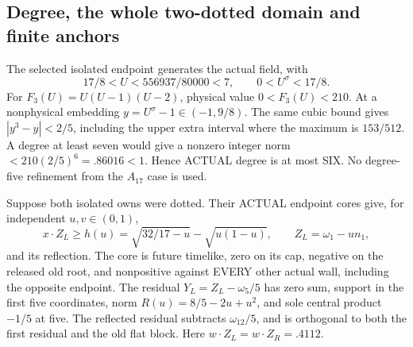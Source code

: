 \documentclass[11pt]{article}
\begin{document}
\subsection{Degree, the whole two-dotted domain and finite anchors}
\label{app:arithA16anchors}

The selected isolated endpoint generates the actual field, with
\[
 17/8<U<556937/80000<7,\qquad0<U^\sigma<17/8 .
\]
For \(F_3(U)=U(U-1)(U-2)\), physical value \(0<F_3(U)<210\).
At a nonphysical embedding \(y=U^\sigma-1\in(-1,9/8)\).
The same cubic bound gives
\(|y^3-y|<2/5\), including the upper extra interval where
the maximum is \(153/512\).
A degree at least seven would give a nonzero integer norm
\(<210(2/5)^6=.86016<1\).
Hence ACTUAL degree is at most SIX.
No degree-five refinement from the \(A_{17}\) case is used.

Suppose both isolated owns were dotted.
Their ACTUAL endpoint cores give, for independent \(u,v\in(0,1)\),
\[
 x\cdot Z_L\ge h(u)=\sqrt{32/17-u}-\sqrt{u(1-u)},\qquad
 Z_L=\omega_1-un_1 ,
\]
and its reflection.
The core is future timelike, zero on its cap, negative on the
released old root, and nonpositive against EVERY other actual
wall, including the opposite endpoint.
The residual \(Y_L=Z_L-\omega_5/5\) has zero sum,
support in the first five coordinates, norm
\(R(u)=8/5-2u+u^2\), and sole central product \(-1/5\)
at five.
The reflected residual subtracts \(\omega_{12}/5\), and is
orthogonal to both the first residual and the old flat block.
Here \(w\cdot Z_L=w\cdot Z_R=.4112\).
\end{document}
